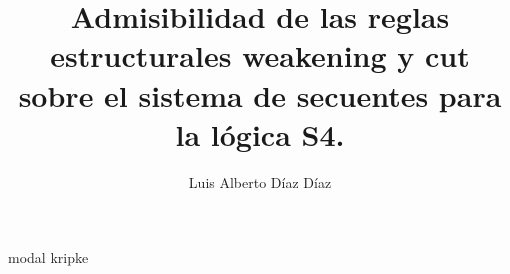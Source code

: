 \documentclass[12pt,twoside,a4paper]{report}
\begin{document}
\title{Admisibilidad de las reglas estructurales weakening y cut sobre el sistema de secuentes para la lógica S4.}

\author{Luis Alberto Díaz Díaz}

\maketitle


{modal}
{kripke}
\end{document}
